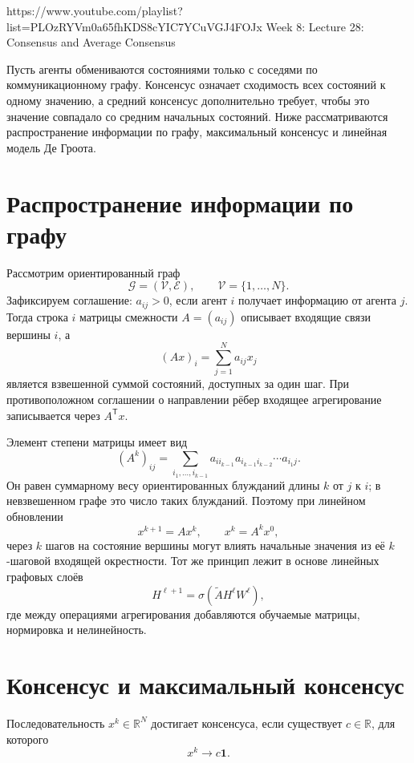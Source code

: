 
\sourcevideo
    {https://www.youtube.com/playlist?list=PLOzRYVm0a65fhKDS8cYIC7YCuVGJ4FOJx}
    {Week 8: Lecture 28: Consensus and Average Consensus}

Пусть агенты обмениваются состояниями только с соседями по
коммуникационному графу. Консенсус означает сходимость всех состояний
к одному значению, а средний консенсус дополнительно требует, чтобы
это значение совпадало со средним начальных состояний. Ниже
рассматриваются распространение информации по графу, максимальный
консенсус и линейная модель Де Гроота.

\section{Распространение информации по графу}

Рассмотрим ориентированный граф
\[
    \mathcal G=(\mathcal V,\mathcal E),
    \qquad
    \mathcal V=\{1,\ldots,N\}.
\]
Зафиксируем соглашение: \(a_{ij}>0\), если агент \(i\) получает
информацию от агента \(j\). Тогда строка \(i\) матрицы смежности
\(A=(a_{ij})\) описывает входящие связи вершины \(i\), а
\[
    (Ax)_i=\sum_{j=1}^{N}a_{ij}x_j
\]
является взвешенной суммой состояний, доступных за один шаг. При
противоположном соглашении о направлении рёбер входящее
агрегирование записывается через \(A^{\mathsf T}x\).

Элемент степени матрицы имеет вид
\[
    (A^k)_{ij}
    =
    \sum_{i_1,\ldots,i_{k-1}}
    a_{ii_{k-1}}a_{i_{k-1}i_{k-2}}\cdots a_{i_1j}.
\]
Он равен суммарному весу ориентированных блужданий длины \(k\) от
\(j\) к \(i\); в невзвешенном графе это число таких блужданий.
Поэтому при линейном обновлении
\[
    x^{k+1}=Ax^k,
    \qquad
    x^k=A^kx^0,
\]
через \(k\) шагов на состояние вершины могут влиять начальные
значения из её \(k\)-шаговой входящей окрестности. Тот же принцип
лежит в основе линейных графовых слоёв
\[
    H^{\ell+1}
    =
    \sigma\!\left(\widetilde A H^\ell W^\ell\right),
\]
где между операциями агрегирования добавляются обучаемые матрицы,
нормировка и нелинейность.

\section{Консенсус и максимальный консенсус}

\begin{definition}[Консенсус]
Последовательность \(x^k\in\mathbb R^N\) достигает консенсуса, если
существует \(c\in\mathbb R\), для которого
\[
    x^k\longrightarrow c\mathbf1.
\]
\end{definition}

